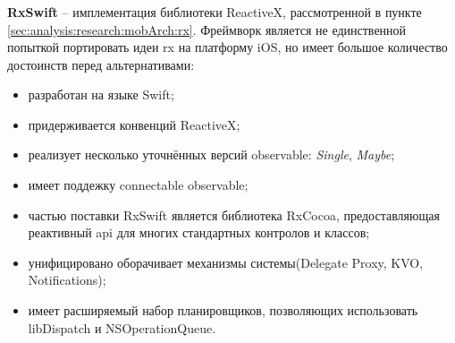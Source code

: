 \subsubsection{}
\label{sec:development:arch:ios:rxswift}

\textbf{RxSwift} -- имплементация библиотеки ReactiveX, рассмотренной в пункте \ref{sec:analysis:research:mobArch:rx}. Фреймворк является не единственной попыткой портировать идеи \gls{rx} на платформу iOS, но имеет большое количество достоинств перед альтернативами:

\begin{itemize}
	\item разработан на языке Swift;
	\item придерживается конвенций ReactiveX;
	\item реализует несколько уточнённых версий \gls{observable}: \textit{Single}, \textit{Maybe};
	\item имеет поддежку connectable \gls{observable};
	\item частью поставки RxSwift является библиотека RxCocoa, предоставляющая реактивный \gls{api} для многих стандартных контролов и классов;
	\item унифицировано оборачивает механизмы системы(Delegate Proxy, KVO, Notifications);
	\item имеет расширяемый набор планировщиков, позволяющих использовать libDispatch и NSOperationQueue.
\end{itemize}
